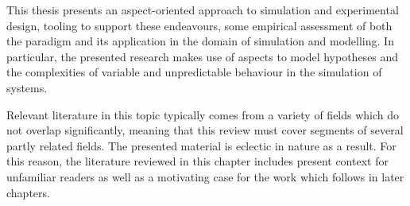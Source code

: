 %
%



This thesis presents an aspect-oriented approach to simulation and experimental
design, tooling to support these endeavours, some empirical assessment of both
the paradigm and its application in the domain of simulation and modelling. In
particular, the presented research makes use of aspects to model hypotheses and
the complexities of variable and unpredictable behaviour in the simulation of
\sociotechnical systems.

Relevant literature in this topic typically comes from a variety of fields which
do not overlap significantly, meaning that this review must cover segments of
several partly related fields. The presented material is eclectic in nature as a
result. For this reason, the literature reviewed in this chapter includes
present context for unfamiliar readers as well as a motivating case for the work
which follows in later chapters.

